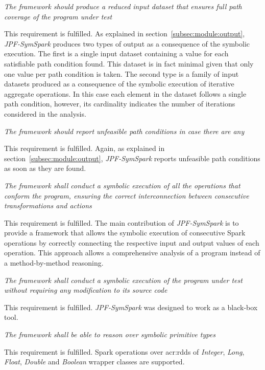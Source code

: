 \begin{itemize}
 \textit{The framework should produce a reduced input dataset that ensures full path coverage of the program under test}

This requirement is fulfilled. As explained in section~\ref{subsec:module:output}, \textit{JPF-SymSpark} produces two types of output as a consequence of the symbolic execution. The first is a single input dataset containing a value for each satisfiable path condition found. This dataset is in fact minimal given that only one value per path condition is taken. The second type is a family of input datasets produced as a consequence of the symbolic execution of iterative aggregate operations. In this case each element in the dataset follows a single path condition, however, its cardinality indicates the number of iterations considered in the analysis.

 \textit{The framework should report unfeasible path conditions in case there are any}

This requirement is fulfilled. Again, as explained in section~\ref{subsec:module:output}, \textit{JPF-SymSpark} reports unfeasible path conditions as soon as they are found.

 \textit{The framework shall conduct a symbolic execution of all the operations that conform the program, ensuring the correct interconnection between consecutive transformations and actions}

This requirement is fulfilled. The main contribution of \textit{JPF-SymSpark} is to provide a framework that allows the symbolic execution of consecutive Spark operations by correctly connecting the respective input and output values of each operation. This approach allows a comprehensive analysis of a program instead of a method-by-method reasoning.

 \textit{The framework shall conduct a symbolic execution of the program under test without requiring any modification to its source code}

This requirement is fulfilled. \textit{JPF-SymSpark} was designed to work as a black-box tool.

 \textit{The framework shall be able to reason over symbolic primitive types}

This requirement is fulfilled. Spark operations over \acrshort{acr:rdd}s of \textit{Integer}, \textit{Long}, \textit{Float}, \textit{Double} and \textit{Boolean} wrapper classes are supported.


\end{itemize}
